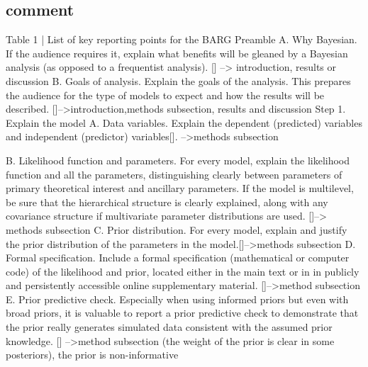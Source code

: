 \documentclass[a4paper,12pt]{article}
\begin{document}
		
		
	
	
	
	
	\subsection{comment}
		Table 1 | List of key reporting points for the BARG
		Preamble
		A. Why Bayesian. If the audience requires it, explain what benefits will be gleaned by a Bayesian analysis (as opposed to a frequentist analysis). [] --> introduction, results or discussion
		B. Goals of analysis. Explain the goals of the analysis. This prepares the audience for the type of models to expect and how the results will be described. []-->introduction,methods subsection, results and discussion
		Step 1. Explain the model
		A. Data variables. Explain the dependent (predicted) variables and independent (predictor) variables[]. -->methods subsection
		
		B. Likelihood function and parameters. For every model, explain the likelihood function and all the parameters, distinguishing clearly between parameters of primary theoretical interest and
		ancillary parameters. If the model is multilevel, be sure that the hierarchical structure is clearly explained, along with any covariance structure if multivariate parameter distributions are
		used.  []--> methods subsection
		C. Prior distribution. For every model, explain and justify the prior distribution of the parameters in the model.[]-->methods subsection
		D. Formal specification. Include a formal specification (mathematical or computer code) of the likelihood and prior, located either in the main text or in in publicly and persistently
		accessible online supplementary material. []-->method subsection
		E. Prior predictive check. Especially when using informed priors but even with broad priors, it is valuable to report a prior predictive check to demonstrate that the prior really generates simulated data consistent with the assumed prior knowledge. [] -->method subsection (the weight of the prior is clear in some posteriors), the prior is non-informative
		
\end{document}
